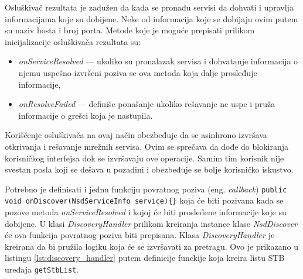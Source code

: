 \documentclass[struktura.tex]{subfiles}
\begin{document}
Osluškivač rezultata je zadužen da kada se pronađu servisi da dohvati i upravlja informacijama koje su dobijene. Neke od informacija koje se dobijaju ovim putem su naziv hosta i broj porta. Metode koje je moguće prepisati prilikom inicijalizacije osluškivača rezultata su:
\begin{itemize}
    \item \textit{onServiceResolved} --- ukoliko su pronalazak servisa i dohvatanje informacija o njemu uspešno izvršeni poziva se ova metoda koja dalje prosleđuje informacije,
    \item \textit{onResolveFailed} --- definiše ponašanje ukoliko rešavanje ne uspe i pruža informacije o grešci koja je nastupila.
\end{itemize}

Koriščenje osluškivača na ovaj način obezbeđuje da se asinhrono izvršava otkrivanja i rešavanje mrežnih servisa. Ovim se sprečava da dođe do blokiranja korisničkog interfejsa dok se izvršavaju ove operacije. Samim tim korisnik nije svestan posla koji se dešava u pozadini i obezbeđuje se bolje korisničko iskustvo. 

Potrebno je definisati i jednu funkciju povratnog poziva (eng. \textit{callback}) \lstinline!public void onDiscover(NsdServiceInfo service){}! koja će biti pozivana kada se pozove metoda \textit{onServiceResolved} i kojoj će biti prosleđene informacije koje su dobijene.  U klasi \textit{DiscoveryHandler} prilikom kreiranja instance klase \textit{NsdDiscover} će ova funkcija povratnog poziva biti prepisana. Klasa \textit{DiscoveryHandler} je kreirana da bi pružila logiku koja će se izvršavati za pretragu. Ovo je prikazano u listingu \ref{lst:discovery_handler} putem definicije funckije koja kreira listu STB uređaja \verb|getStbList|.


\end{document}

